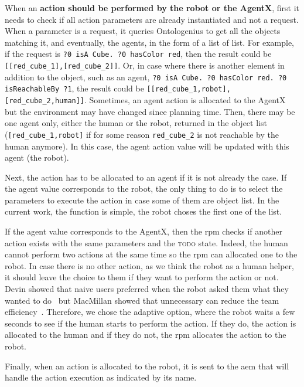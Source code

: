 \documentclass[a4paper,11pt,twoside]{StyleThese}
\begin{document}
When an \textbf{action should be performed by the robot or the AgentX}, first it needs to check if all action parameters are already instantiated and not a \sparql{} request. When a parameter is a \sparql{} request, it queries Ontologenius to get all the objects matching it, and eventually, the agents, in the form of a list of list. For example, if the \sparql{} request is \verb'?0 isA Cube. ?0 hasColor red', then the result could be \verb'[[red_cube_1],[red_cube_2]]'. Or, in case where there is another element in addition to the object, such as an agent, \eg \verb'?0 isA Cube. ?0 hasColor red. ?0 isReachableBy ?1', the result could be \verb'[[red_cube_1,robot],[red_cube_2,human]]'. Sometimes, an agent action is allocated to the AgentX but the environment may have changed since planning time. Then, there may be one agent only, either the human or the robot, returned in the object list (\eg \verb'[red_cube_1,robot]' if for some reason \verb'red_cube_2' is not reachable by the human anymore). In this case, the agent action value will be updated with this agent (\eg the robot). 

Next, the action has to be allocated to an agent if it is not already the case. If the agent value corresponds to the robot, the only thing to do is to select the parameters to execute the action in case some of them are object list. In the current work, the function is simple, the robot choses the first one of the list. 

If the agent value corresponds to the AgentX, then the \acrshort{rpm} checks if another action exists with the same parameters and the \textsc{todo} state. Indeed, the human cannot perform two actions at the same time so the \acrshort{rpm} can allocated one to the robot. In case there is no other action, as we think the robot as a human helper, it should leave the choice to them if they want to perform the action or not. Devin showed that naive users preferred when the robot asked them what they wanted to do~\cite{devin_2017_decisions} but MacMillan \etal showed that unnecessary can reduce the team efficiency~\cite{macmillan_2004_communication}. Therefore, we chose the adaptive option, where the robot waits a few seconds to see if the human starts to perform the action. If they do, the action is allocated to the human and if they do not, the \acrshort{rpm} allocates the action to the robot. 

Finally, when an action is allocated to the robot, it is sent to the \acrlong{aem} that will handle the action execution as indicated by its name.
\end{document}
